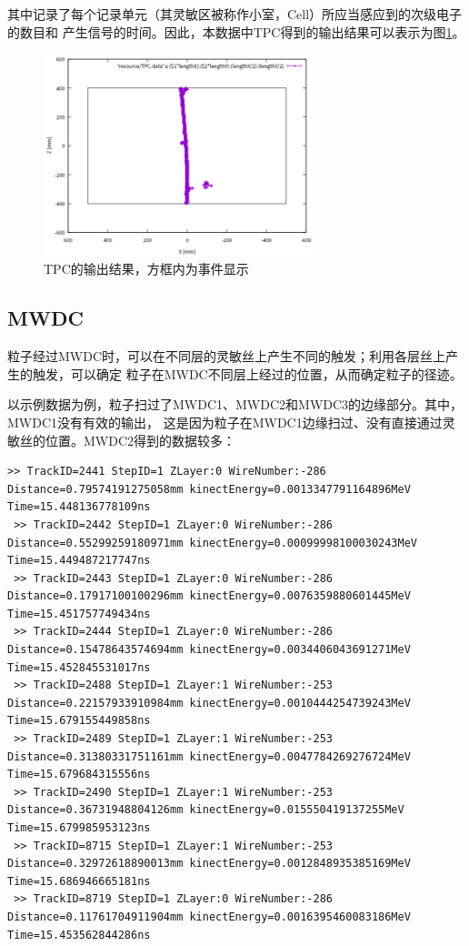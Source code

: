 \documentclass[bachelor,openany,oneside,color]{buaathesis}
\begin{document}
其中记录了每个记录单元（其灵敏区被称作小室，Cell）所应当感应到的次级电子的数目和
产生信号的时间。因此，本数据中TPC得到的输出结果可以表示为图\ref{fig:result:TPC}。

\begin{figure}
	\centering
	\includegraphics[width=0.7\textwidth]{./resource/TPC-result.png}
	\caption{TPC的输出结果，方框内为事件显示}\label{fig:result:TPC}
\end{figure}

\subsection{MWDC}

粒子经过MWDC时，可以在不同层的灵敏丝上产生不同的触发；利用各层丝上产生的触发，可以确定
粒子在MWDC不同层上经过的位置，从而确定粒子的径迹。

以示例数据为例，粒子扫过了MWDC1、MWDC2和MWDC3的边缘部分。其中，MWDC1没有有效的输出，
这是因为粒子在MWDC1边缘扫过、没有直接通过灵敏丝的位置。MWDC2得到的数据较多：

\begin{lstlisting}[firstnumber=3760,lastline=3768]
 >> TrackID=2441 StepID=1 ZLayer:0 WireNumber:-286 Distance=0.79574191275058mm kinectEnergy=0.0013347791164896MeV Time=15.448136778109ns
 >> TrackID=2442 StepID=1 ZLayer:0 WireNumber:-286 Distance=0.55299259180971mm kinectEnergy=0.00099998100030243MeV Time=15.449487217747ns
 >> TrackID=2443 StepID=1 ZLayer:0 WireNumber:-286 Distance=0.17917100100296mm kinectEnergy=0.0076359880601445MeV Time=15.451757749434ns
 >> TrackID=2444 StepID=1 ZLayer:0 WireNumber:-286 Distance=0.15478643574694mm kinectEnergy=0.0034406043691271MeV Time=15.452845531017ns
 >> TrackID=2488 StepID=1 ZLayer:1 WireNumber:-253 Distance=0.22157933910984mm kinectEnergy=0.0010444254739243MeV Time=15.679155449858ns
 >> TrackID=2489 StepID=1 ZLayer:1 WireNumber:-253 Distance=0.31380331751161mm kinectEnergy=0.0047784269276724MeV Time=15.679684315556ns
 >> TrackID=2490 StepID=1 ZLayer:1 WireNumber:-253 Distance=0.36731948804126mm kinectEnergy=0.015550419137255MeV Time=15.679985953123ns 
 >> TrackID=8715 StepID=1 ZLayer:1 WireNumber:-253 Distance=0.32972618890013mm kinectEnergy=0.0012848935385169MeV Time=15.686946665181ns
 >> TrackID=8719 StepID=1 ZLayer:0 WireNumber:-286 Distance=0.11761704911904mm kinectEnergy=0.0016395460083186MeV Time=15.453562844286ns
\end{lstlisting}
\end{document}
